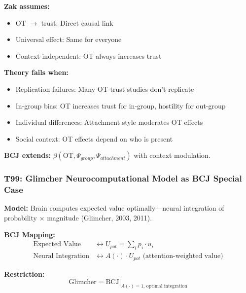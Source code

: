 \begin{tcolorbox}[colback=red!5!white, colframe=red!75!black,
    title=Boundary Condition: Where Zak Fails]
\textbf{Zak assumes:}
\begin{itemize}[nosep]
\item OT $\to$ trust: Direct causal link
\item Universal effect: Same for everyone
\item Context-independent: OT always increases trust
\end{itemize}

\textbf{Theory fails when:}
\begin{itemize}[nosep]
\item Replication failures: Many OT-trust studies don't replicate
\item In-group bias: OT increases trust for in-group, hostility for out-group
\item Individual differences: Attachment style moderates OT effects
\item Social context: OT effects depend on who is present
\end{itemize}

\textbf{BCJ extends:} $\beta(\text{OT}, \Psi_{group}, \Psi_{attachment})$ with context modulation.
\end{tcolorbox}

\subsubsection*{T99: Glimcher Neurocomputational Model as BCJ Special Case}

\textbf{Model:} Brain computes expected value optimally---neural integration of probability $\times$ magnitude (Glimcher, 2003, 2011).

\textbf{BCJ Mapping:}
\begin{align}
\text{Expected Value} &\leftrightarrow U_{pot} = \sum_i p_i \cdot u_i \\
\text{Neural Integration} &\leftrightarrow A(\cdot) \cdot U_{pot} \text{ (attention-weighted value)}
\end{align}

\textbf{Restriction:}
\begin{equation}
\text{Glimcher} = \text{BCJ} \big|_{A(\cdot) = 1, \, \text{optimal integration}}
\end{equation}

